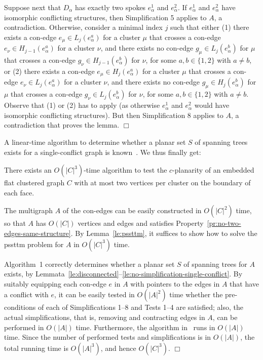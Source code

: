 \documentclass[letter,runningheads]{llncs}
\renewenvironment{proof}
{{\em Proof.\ }}{\hspace*{\fill}$\Box$\par\vspace{2mm}}
\begin{document}
\begin{proof}
Suppose next that $D_{\alpha}$ has exactly two spokes $e^1_{\alpha}$ and $e^2_{\alpha}$. If $e^1_{\alpha}$ and $e^2_{\alpha}$ have isomorphic conflicting structures, then {\sc Simplification 5} applies to $A$, a contradiction. Otherwise, consider a minimal index $j$ such that either (1) there exists a con-edge $e_{\mu}\in L_j(e^a_{\alpha})$ for a cluster $\mu$ that crosses a con-edge $e_{\nu}\in H_{j-1}(e^a_{\alpha})$ for a cluster  $\nu$, and there exists no con-edge $g_{\mu}\in L_j(e^b_{\alpha})$ for $\mu$ that crosses a con-edge $g_{\nu}\in H_{j-1}(e^b_{\alpha})$ for $\nu$, for some $a,b\in\{1,2\}$ with $a\neq b$, or (2) there exists a con-edge $e_{\mu}\in H_j(e^a_{\alpha})$ for a cluster $\mu$ that crosses a con-edge $e_{\nu}\in L_{j}(e^a_{\alpha})$ for a cluster  $\nu$, and there exists no con-edge $g_{\mu}\in H_j(e^b_{\alpha})$ for $\mu$ that crosses a con-edge $g_{\nu}\in L_{j}(e^b_{\alpha})$ for $\nu$, for some $a,b\in\{1,2\}$ with $a\neq b$. Observe that (1) or (2) has to apply (as otherwise $e^1_{\alpha}$ and $e^2_{\alpha}$ would have isomorphic conflicting structures). But then {\sc Simplification 8} applies to $A$, a contradiction that proves the lemma.
\end{proof}

A linear-time algorithm to determine whether a planar set $S$ of spanning trees exists for a single-conflict graph is known~\cite{df-ectefcgsf-09}. We thus finally get:

\begin{theorem} \label{th:main}
There exists an $O(|C|^3)$-time algorithm to test the $c$-planarity of an embedded flat clustered graph $C$ with at most two vertices per cluster on the boundary of each face.
\end{theorem}

\begin{proof}
The multigraph $A$ of the con-edges can be easily constructed in $O(|C|^2)$ time, so that $A$ has $O(|C|)$ vertices and edges and satisfies Property~\ref{pr:no-two-edges-same-structure}. By Lemma~\ref{le:pssttm}, it suffices to show how to solve the {\sc pssttm} problem for $A$ in $O(|C|^3)$ time.

Algorithm~1 correctly determines whether a planar set $S$ of spanning trees for $A$ exists, by Lemmata~\ref{le:disconnected}--\ref{le:no-simplification-single-conflict}. By suitably equipping each con-edge $e$ in $A$ with pointers to the edges in $A$ that have a conflict with $e$, it can be easily tested in $O(|A|^2)$ time whether the pre-conditions of each of {\sc Simplifications 1--8} and {\sc Tests 1--4} are satisfied; also, the actual simplifications, that is, removing and contracting edges in $A$, can be performed in $O(|A|)$ time. Furthermore, the algorithm in~\cite{df-ectefcgsf-09} runs in $O(|A|)$ time. Since the number of performed tests and simplifications is in $O(|A|)$, the total running time is $O(|A|^3)$, and hence $O(|C|^3)$.
\end{proof}
\end{document}
